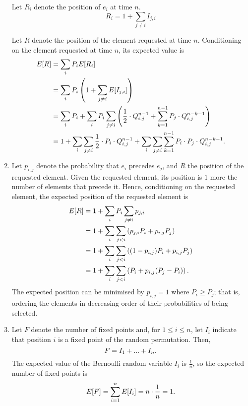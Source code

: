 \documentclass{article}
\begin{document}
\begin{enumerate}
    Let $R_i$ denote the position of $e_i$ at time $n$.
    \[ R_i = 1 + \sum_{j\neq i}I_{j,i} \]

    Let $R$ denote the position of the element requested at time $n$.
    Conditioning on the element requested at time $n$, its expected value is
    \[\begin{split}
    E[R]    & = \sum_i P_i E[R_i] \\
            & = \sum_i P_i \left( 1 + \sum_{j \neq i}E[I_{j,i}] \right) \\
            & = \sum_i P_i + \sum_i P_i \sum_{j \neq i} \left( \frac{1}{2} \cdot Q_{i,j}^{n-1} + \sum_{k=1}^{n-1} P_j \cdot Q_{i,j}^{n-k-1} \right) \\
            & = 1 + \sum_i \sum_{j \neq i} \frac{1}{2} \cdot P_i \cdot Q_{i,j}^{n-1} + \sum_i \sum_{j \neq i} \sum_{k=1}^{n-1} P_i \cdot P_j \cdot Q_{i,j}^{n-k-1} \text.
    \end{split}\]
\item
    Let $p_{i,j}$ denote the probability that $e_i$ precedes $e_j$, and $R$ the position of the requested element.
    Given the requested element, its position is $1$ more the number of elements that precede it.
    Hence, conditioning on the requested element, the expected position of the requested element is
    \[\begin{split}
    E[R]    & = 1 + \sum_iP_i \sum_{j\neq i} p_{j,i} \\
            & = 1 + \sum_i\sum_{j<i} \left( p_{j,i}P_i + p_{i,j}P_j \right) \\
            & = 1 + \sum_i\sum_{j<i} \left( (1-p_{i,j})P_i + p_{i,j}P_j \right) \\
            & = 1 + \sum_i\sum_{j<i} \left( P_i + p_{i,j}( P_j-P_i ) \right) \text. \\
    \end{split}\]
    The expected position can be minimised by $p_{i,j}=1$ where $P_i\geq P_j$; that is, ordering the elements in
    decreasing order of their probabilities of being selected.
\item
    Let $F$ denote the number of fixed points
    and, for $1 \leq i \leq n$, let $I_i$ indicate that position $i$ is a fixed point of the random permutation.
    Then,
    \[ F = I_1 + ... + I_n \text. \]
    The expected value of the Bernoulli random variable $I_i$ is $\frac{1}{n}$, so the expected number of fixed points is
    \[ E[F] = \sum_{i=1}^nE[I_i] = n\cdot\frac{1}{n} = 1 \text. \]


\end{enumerate}
\end{document}
